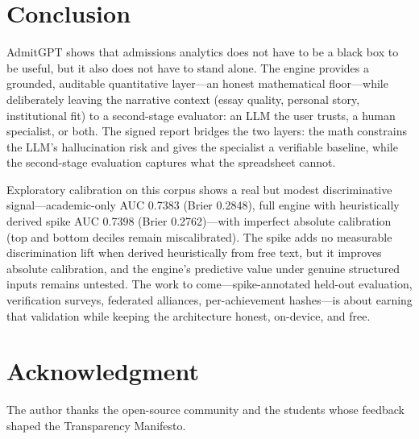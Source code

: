 \documentclass[conference]{IEEEtran}
\begin{document}
\section{Conclusion}
AdmitGPT shows that admissions analytics does not have to be a black box to be useful, but it also does not have to stand alone. The engine provides a grounded, auditable quantitative layer---an honest mathematical floor---while deliberately leaving the narrative context (essay quality, personal story, institutional fit) to a second-stage evaluator: an LLM the user trusts, a human specialist, or both. The signed report bridges the two layers: the math constrains the LLM's hallucination risk and gives the specialist a verifiable baseline, while the second-stage evaluation captures what the spreadsheet cannot.

Exploratory calibration on this corpus shows a real but modest discriminative signal---academic-only AUC 0.7383 (Brier 0.2848), full engine with heuristically derived spike AUC 0.7398 (Brier 0.2762)---with imperfect absolute calibration (top and bottom deciles remain miscalibrated). The spike adds no measurable discrimination lift when derived heuristically from free text, but it improves absolute calibration, and the engine's predictive value under genuine structured inputs remains untested. The work to come---spike-annotated held-out evaluation, verification surveys, federated alliances, per-achievement hashes---is about earning that validation while keeping the architecture honest, on-device, and free.

\section*{Acknowledgment}
The author thanks the open-source community and the students whose feedback shaped the Transparency Manifesto.
\end{document}
